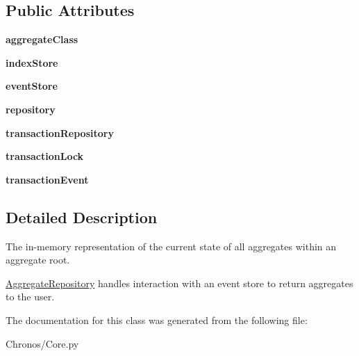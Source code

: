 \subsection*{Public Attributes}
\begin{DoxyCompactItemize}
\item 
{\bfseries aggregate\+Class}
\item 
{\bfseries index\+Store}
\item 
{\bfseries event\+Store}
\item 
{\bfseries repository}
\item 
{\bfseries transaction\+Repository}
\item 
{\bfseries transaction\+Lock}
\item 
{\bfseries transaction\+Event}
\end{DoxyCompactItemize}


\subsection{Detailed Description}
The in-\/memory representation of the current state of all aggregates within an aggregate root. 

\hyperlink{classChronos_1_1Core_1_1AggregateRepository}{Aggregate\+Repository} handles interaction with an event store to return aggregates to the user. 

The documentation for this class was generated from the following file\+:\begin{DoxyCompactItemize}
\item 
Chronos/Core.\+py\end{DoxyCompactItemize}
